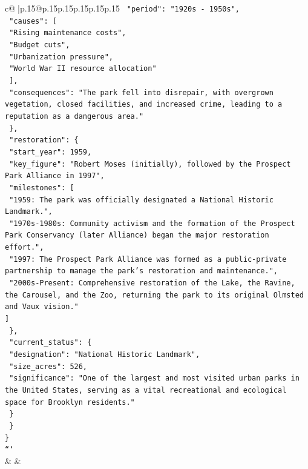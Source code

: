 \documentclass{article}
\begin{document}
{\begin{supertabular}{c@{$\;$}|p{.15\linewidth}@{}p{.15\linewidth}p{.15\linewidth}p{.15\linewidth}p{.15\linewidth}p{.15\linewidth}}
{{{\texttt{      "period": "1920s {-} 1950s",} \\
\texttt{      "causes": {[}} \\
\texttt{        "Rising maintenance costs",} \\
\texttt{        "Budget cuts",} \\
\texttt{        "Urbanization pressure",} \\
\texttt{        "World War II resource allocation"} \\
\texttt{      {]},} \\
\texttt{      "consequences": "The park fell into disrepair, with overgrown vegetation, closed facilities, and increased crime, leading to a reputation as a dangerous area."} \\
\texttt{    \},} \\
\texttt{    "restoration": \{} \\
\texttt{      "start\_year": 1959,} \\
\texttt{      "key\_figure": "Robert Moses (initially), followed by the Prospect Park Alliance in 1997",} \\
\texttt{      "milestones": {[}} \\
\texttt{        "1959: The park was officially designated a National Historic Landmark.",} \\
\texttt{        "1970s{-}1980s: Community activism and the formation of the Prospect Park Conservancy (later Alliance) began the major restoration effort.",} \\
\texttt{        "1997: The Prospect Park Alliance was formed as a public{-}private partnership to manage the park's restoration and maintenance.",} \\
\texttt{        "2000s{-}Present: Comprehensive restoration of the Lake, the Ravine, the Carousel, and the Zoo, returning the park to its original Olmsted and Vaux vision."} \\
\texttt{      {]}} \\
\texttt{    \},} \\
\texttt{    "current\_status": \{} \\
\texttt{      "designation": "National Historic Landmark",} \\
\texttt{      "size\_acres": 526,} \\
\texttt{      "significance": "One of the largest and most visited urban parks in the United States, serving as a vital recreational and ecological space for Brooklyn residents."} \\
\texttt{    \}} \\
\texttt{  \}} \\
\texttt{\}} \\
\texttt{```} \\
            }
        }
    }
    & & \\ \\


\end{supertabular}}
\end{document}
